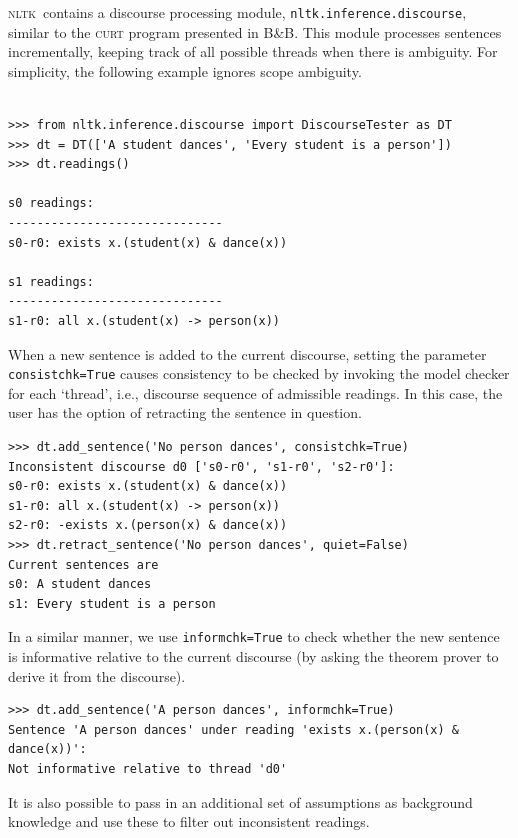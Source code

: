 \documentclass[11pt, a4paper]{article}
\newcommand{\BB}{\textsc{B{\small\&}B}}
\newcommand{\NLTK}{\textsc{nltk}}
\begin{document}
\NLTK\ contains a discourse processing module,
\texttt{nltk.inference.discourse}, similar to the \textsc{curt} program
presented in \BB.  This module processes sentences incrementally,
keeping track of all possible threads when there is ambiguity. For
simplicity, the following example ignores scope ambiguity.
\begin{Verbatim}[baselinestretch=.5]

>>> from nltk.inference.discourse import DiscourseTester as DT
>>> dt = DT(['A student dances', 'Every student is a person'])
>>> dt.readings()

s0 readings:
------------------------------
s0-r0: exists x.(student(x) & dance(x))

s1 readings:
------------------------------
s1-r0: all x.(student(x) -> person(x))
\end{Verbatim}
When a new sentence is added to the current discourse, setting the
parameter \texttt{consistchk=True} causes consistency to be checked
by invoking the model checker for each `thread', i.e., discourse sequence of
admissible readings. In this case, the user has the option
of retracting the sentence in question.
\begin{Verbatim}
>>> dt.add_sentence('No person dances', consistchk=True)
Inconsistent discourse d0 ['s0-r0', 's1-r0', 's2-r0']:
s0-r0: exists x.(student(x) & dance(x))
s1-r0: all x.(student(x) -> person(x))
s2-r0: -exists x.(person(x) & dance(x))
>>> dt.retract_sentence('No person dances', quiet=False)
Current sentences are 
s0: A student dances
s1: Every student is a person
\end{Verbatim}
In a similar manner, we use \texttt{informchk=True} to check whether
the new sentence is informative relative to the current discourse (by
asking the theorem prover to derive it from the discourse).
\begin{Verbatim}
>>> dt.add_sentence('A person dances', informchk=True)
Sentence 'A person dances' under reading 'exists x.(person(x) & dance(x))':
Not informative relative to thread 'd0'
\end{Verbatim}
It is also possible to pass in an additional set of assumptions as
background knowledge and use these to filter out inconsistent readings.
\end{document}
